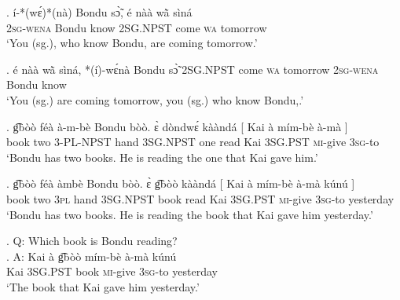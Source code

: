 \documentclass{assets/fieldnotes}
\begin{document}
\exg. í-*(wɛ́)*(nà) Bondu sɔ̃̀, é nàà wã̀ sìná\\
\textsc{2sg}-\textsc{wena} Bondu know \textsc{2SG.NPST} come \textsc{wa} tomorrow\\
`You (sg.), who know Bondu, are coming tomorrow.’\\

\exg. é nàà wã̀ sìná, *(í)-wɛ́nà Bondu sɔ̃̀ 
\textsc{2SG.NPST} come \textsc{wa} tomorrow \textsc{2sg}-\textsc{wena} Bondu know \\
`You (sg.) are coming tomorrow, you (sg.) who know Bondu,.’

\exg. g͡bòò féà à-m-bè Bondu bòò. ɛ̀ dòndwɛ́ kààndá {[} Kai à mím-bè à-mà {]}\\
book two \textsc{3-PL-NPST} {} hand \textsc{3SG.NPST} one read {} Kai \textsc{3SG.PST} \textsc{mi}-give \textsc{3sg}-to {}\\
`Bondu has two books. He is reading the one that Kai gave him.’

\exg. g͡bòò féà àmbè Bondu bòò. ɛ̀ g͡bòò kààndá {[} Kai à mím-bè à-mà kúnú ]\\
book two \textsc{3pl} {} hand \textsc{3SG.NPST} book read {} Kai \textsc{3SG.PST} \textsc{mi}-give \textsc{3sg}-to yesterday {}\\
`Bondu has two books. He is reading the book that Kai gave him yesterday.’


\ex. Q: Which book is Bondu reading?\\
\ag. A: Kai à g͡bòò mím-bè à-mà kúnú\\
{} Kai \textsc{3SG.PST} book \textsc{mi}-give \textsc{3sg}-to yesterday\\
`The book that Kai gave him yesterday.'\\
\end{document}
